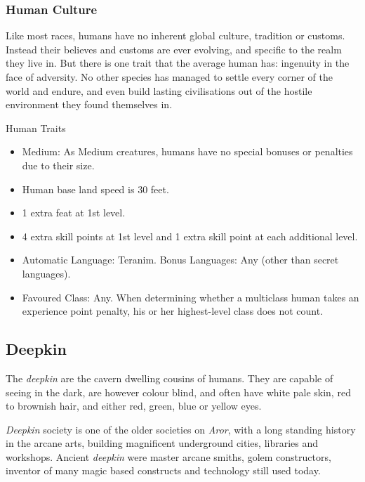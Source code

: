 \subsubsection*{Human Culture}

Like most races, humans have no inherent global culture, tradition or customs.
Instead their believes and customs are ever evolving, and specific to the
realm they live in. But there is one trait that the average human has: ingenuity
in the face of adversity. No other species has managed to settle every corner
of the world and endure, and even build lasting civilisations out of the
hostile environment they found themselves in.

\begin{35e}{Human Traits}
  \begin{itemize}[noitemsep]
  \item Medium: As Medium creatures, humans have no special bonuses or
    penalties due to their size.
  \item Human base land speed is 30 feet.
  \item 1 extra feat at 1st level.
  \item 4 extra skill points at 1st level and 1 extra skill point at each
    additional level.
  \item Automatic Language: Teranim. Bonus Languages: Any (other than secret
    languages).
  \item Favoured Class: Any. When determining whether a multiclass human takes
    an experience point penalty, his or her highest-level class does not count.
  \end{itemize}
\end{35e}

\subsection{Deepkin}
\label{sec:Deepkin}



The \emph{deepkin} are the cavern dwelling cousins of humans. They are capable
of seeing in the dark, are however colour blind, and often have white pale
skin, red to brownish hair, and either red, green, blue or yellow eyes.

\emph{Deepkin} society is one of the older societies on \emph{Aror}, with a
long standing history in the arcane arts, building magnificent underground
cities, libraries and workshops. Ancient \emph{deepkin} were master arcane
smiths, golem constructors, inventor of many magic based constructs and
technology still used today.


